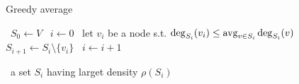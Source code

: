 \begin{algorithm}
    \caption{Greedy average}\label{alg:greedy_avg}
    \begin{algorithmic}%
            \State~$S_0 \gets V$
            \State~$i \gets 0$
                    \State~let $v_i$ be a node s.t. $\deg_{S_i}(v_i) \leq \operatorname*{avg}_{v \in S_i} \deg_{S_i}(v)$
                    \State~$S_{i+1} \gets S_i \setminus \{v_i\}$
                    \State~$i \gets i+1$
                \EndWhile
                
            \Return~a set $S_i$ having larget density $\rho(S_i)$
        \EndProcedure
    \end{algorithmic}
\end{algorithm}